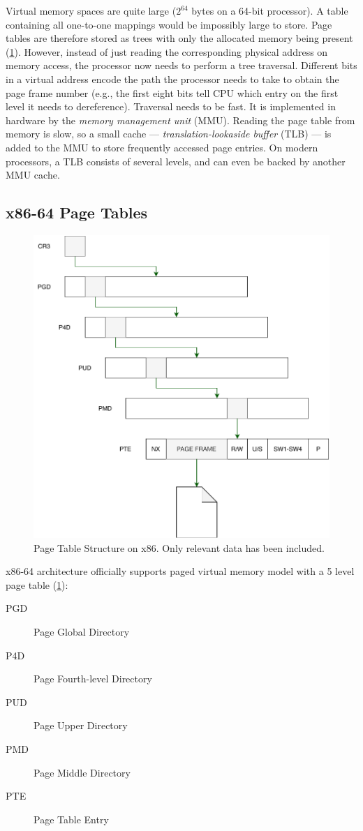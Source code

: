 Virtual memory spaces are quite large ($2^{64}$ bytes on a 64-bit processor). A
table containing all one-to-one mappings would be impossibly large to store.
Page tables are therefore stored as trees with only the allocated memory being
present (\cref{fig:pagetable}). However, instead of just reading the
corresponding physical address on memory access, the processor now needs to
perform a tree traversal. Different bits in a virtual address encode the path
the processor needs to take to obtain the page frame number (e.g., the first
eight bits tell CPU which entry on the first level it needs to dereference).
Traversal needs to be fast. It is implemented in hardware by the \emph{memory
management unit} (MMU). Reading the page table from memory is slow, so a small
cache --- \emph{translation-lookaside buffer} (TLB) --- is added to the MMU to
store frequently accessed page entries. On modern processors, a TLB consists of
several levels, and can even be backed by another MMU cache. 

\subsection{x86-64 Page Tables}
\label{subsec:x86pgtables}
\begin{figure}[]
  \centering
  \includegraphics[width = .35 \textwidth]{img/pagetable.pdf}
  \caption{Page Table Structure on x86. Only relevant data has been included.}
  \label{fig:pagetable}
\end{figure}
x86-64 architecture officially supports paged virtual memory model with a 5 
level page table (\cref{fig:pagetable}):
\begin{description}
    \item[PGD] Page Global Directory
    \item[P4D] Page Fourth-level Directory
    \item[PUD] Page Upper Directory
    \item[PMD] Page Middle Directory
    \item[PTE] Page Table Entry
\end{description}

